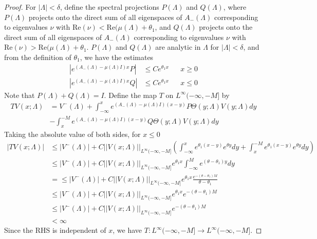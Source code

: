 \documentclass[thesis.tex]{subfiles}
\begin{document}
\begin{lemma}
\begin{proof}
For $|\Lambda| < \delta$, define the spectral projections $P(\Lambda)$ and $Q(\Lambda)$, where $P(\Lambda)$ projects onto the direct sum of all eigenspaces of $A_-(\Lambda)$ corresponding to eigenvalues $\nu$ with $\text{Re}(\nu) < \text{Re}(\mu(\Lambda) + \theta_1$, and $Q(\Lambda)$ projects onto the direct sum of all eigenspaces of $A_-(\Lambda)$ corresponding to eigenvalues $\nu$ with $\text{Re}(\nu) > \text{Re}(\mu(\Lambda) + \theta_1$. $P(\Lambda)$ and $Q(\Lambda)$ are analytic in $\Lambda$ for $|\Lambda| < \delta$, and from the definition of $\theta_1$, we have the estimates
\begin{align*}
\left|e^{(A_-(\Lambda) - \mu(\Lambda)I)x}P \right| &\leq C e^{\theta_1 x} && x \geq 0 \\
\left|e^{(A_-(\Lambda) - \mu(\Lambda)I)x}Q \right| &\leq C e^{\theta_1 x} && x \leq 0
\end{align*}
Note that $P(\Lambda) + Q(\Lambda) = I$. Define the map $T$ on $L^\infty(-\infty, -M]$ by
\begin{align*}
TV(x; \Lambda) &= V^-(\Lambda) 
+ \int_{-\infty}^x e^{(A_-(\Lambda) - \mu(\Lambda)I)(x-y)}P\Theta(y; \Lambda) V(y; \Lambda) dy \\
&- \int_x^{-M} e^{(A_-(\Lambda) - \mu(\Lambda)I)(x-y)}Q\Theta(y; \Lambda) V(y; \Lambda) dy
\end{align*}
Taking the absolute value of both sides, for $x \leq 0$
\begin{align*}
|TV(x; \Lambda)| &\leq |V^-(\Lambda)| + C ||V(x; \Lambda)||_{L^\infty(-\infty, -M]}
\left( \int_{-\infty}^x e^{\theta_1 (x - y)} e^{\theta y} dy + \int_x^{-M} e^{\theta_1 (x - y)} e^{\theta y} dy \right) \\
&\leq |V^-(\Lambda)| + C ||V(x; \Lambda)||_{L^\infty(-\infty, -M]} e^{\theta_1 x} \int_{-\infty}^M e^{(\theta - \theta_1) y} dy \\
&= \leq |V^-(\Lambda)| + C ||V(x; \Lambda)||_{L^\infty(-\infty, -M]} e^{\theta_1 x} \frac{e^{-(\theta - \theta_1)M}}{\theta - \theta_1}\\
&\leq |V^-(\Lambda)| + C ||V(x; \Lambda)||_{L^\infty(-\infty, -M]} e^{\theta_1 x} e^{-(\theta - \theta_1)M} \\
&\leq |V^-(\Lambda)| + C ||V(x; \Lambda)||_{L^\infty(-\infty, -M]} e^{-(\theta - \theta_1)M} \\
& < \infty
\end{align*}
Since the RHS is independent of $x$, we have $T: L^\infty(-\infty, -M] \rightarrow L^\infty(-\infty, -M]$. 


\end{proof}
\end{lemma}
\end{document}

